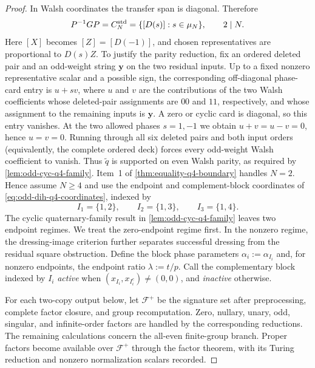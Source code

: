 \documentclass[11pt,letterpaper,onecolumn]{article}
\theoremstyle{plain}
\theoremstyle{definition}
\theoremstyle{remark}
\newcommand{\cF}{\mathcal F}
\begin{document}
\begin{proof}
In Walsh coordinates the transfer span is diagonal. Therefore
\begin{equation*}
  P^{-1}GP=C_N^{\rm std}=\{[D(s)]:s\in\mu_N\},
  \qquad 2\mid N.
\end{equation*}
Here \([X]\) becomes \([Z]=[D(-1)]\), and chosen representatives are
proportional to \(D(s)Z\).  To justify the parity reduction, fix an ordered
deleted pair and an odd-weight string \({\mathbf{y}}\) on the two residual inputs.  Up to
a fixed nonzero representative scalar and a possible sign, the corresponding
off-diagonal phase-card entry is \(u+sv\), where \(u\) and \(v\) are the
contributions of the two Walsh coefficients whose deleted-pair assignments
are \(00\) and \(11\), respectively, and whose assignment to the remaining inputs is \({\mathbf{y}}\).  A zero or
cyclic card is diagonal, so this entry vanishes.  At the two allowed phases \(s=1,-1\) we obtain \(u+v=u-v=0\), hence \(u=v=0\).  Running through
all six deleted pairs and both input orders (equivalently, the complete
ordered deck) forces every odd-weight Walsh coefficient to vanish.  Thus
\(\widetilde q\) is supported on even Walsh parity, as required by
\cref{lem:odd-cyc-q4-family}.  Item~1 of
\cref{thm:equality-q4-boundary} handles \(N=2\). Hence
assume \(N\ge4\) and use the endpoint and complement-block coordinates of
\cref{eq:odd-dih-q4-coordinates}, indexed by
\[
  I_1=\{1,2\},\qquad I_2=\{1,3\},\qquad I_3=\{1,4\}.
\]
The cyclic quaternary-family result in \cref{lem:odd-cyc-q4-family} leaves two
endpoint regimes.  We treat the zero-endpoint regime first. In the nonzero
regime, the dressing-image criterion further separates successful dressing
from the residual square obstruction.
Define the block phase parameters \(\alpha_i:=\alpha_{I_i}\) and, for
nonzero endpoints, the endpoint ratio \(\lambda:=t/p\).
Call the complementary block indexed by \(I_i\) \emph{active} when
\((x_{I_i},x_{I_i^c})\ne(0,0)\), and \emph{inactive} otherwise.

For each two-copy output below, let \(\cF^+\) be the signature set after preprocessing, complete factor closure, and group
recomputation.  Zero, nullary, unary, odd, singular, and infinite-order
factors are handled by the corresponding reductions.  The remaining calculations concern
the all-even finite-group branch.  Proper factors become available over
\(\cF^+\) through the factor theorem, with its Turing reduction and
nonzero normalization scalars recorded.


\end{proof}
\end{document}
